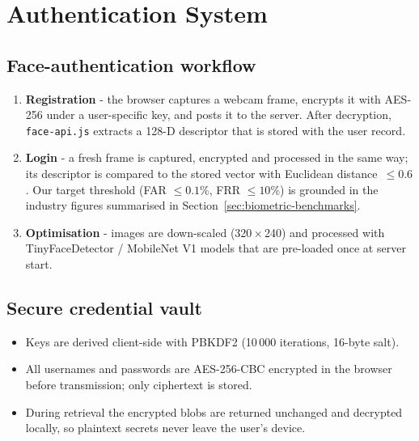 \section{Authentication System}

\subsection{Face-authentication workflow}
\begin{enumerate}
  \item \textbf{Registration} - the browser captures a webcam frame, encrypts it with AES-256 under a user-specific key, and posts it to the server. After decryption, \texttt{face-api.js} extracts a 128-D descriptor that is stored with the user record.
  \item \textbf{Login} - a fresh frame is captured, encrypted and processed in the same way; its descriptor is compared to the stored vector with Euclidean distance~$\le0.6$. Our target threshold (FAR $\leq 0.1\%$, FRR $\leq 10\%$) is grounded in the industry figures summarised in Section~\ref{sec:biometric-benchmarks}.
  \item \textbf{Optimisation} - images are down-scaled (320\,$\times$\,240) and processed with TinyFaceDetector / MobileNet V1 models that are pre-loaded once at server start.
\end{enumerate}

\subsection{Secure credential vault}
\begin{itemize}
  \item Keys are derived client-side with PBKDF2 (10\,000 iterations, 16-byte salt).  
  \item All usernames and passwords are AES-256-CBC encrypted in the browser before transmission; only ciphertext is stored.  
  \item During retrieval the encrypted blobs are returned unchanged and decrypted locally, so plaintext secrets never leave the user's device.  
\end{itemize}

\clearpage

